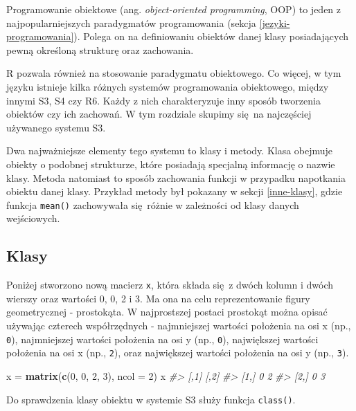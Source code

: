 \documentclass[paper=6in:9in,pagesize=pdftex,headinclude=on,footinclude=on,10pt]{scrbook}
\newenvironment{Shaded}{\begin{snugshade}}{\end{snugshade}}
\newcommand{\CommentTok}[1]{\textcolor[rgb]{0.56,0.35,0.01}{\textit{#1}}}
\newcommand{\DataTypeTok}[1]{\textcolor[rgb]{0.13,0.29,0.53}{#1}}
\newcommand{\DecValTok}[1]{\textcolor[rgb]{0.00,0.00,0.81}{#1}}
\newcommand{\KeywordTok}[1]{\textcolor[rgb]{0.13,0.29,0.53}{\textbf{#1}}}
\newcommand{\NormalTok}[1]{#1}
\newcommand{\StringTok}[1]{\textcolor[rgb]{0.31,0.60,0.02}{#1}}
\begin{document}
Programowanie obiektowe (ang. \emph{object-oriented programming}, OOP) to jeden z najpopularniejszych paradygmatów programowania (sekcja \ref{jezyki-programowania}).
Polega on na definiowaniu obiektów danej klasy posiadających pewną określoną strukturę oraz zachowania.

R pozwala również na stosowanie paradygmatu obiektowego.
Co więcej, w tym języku istnieje kilka różnych systemów programowania obiektowego, między innymi S3, S4 czy R6.
Każdy z nich charakteryzuje inny sposób tworzenia obiektów czy ich zachowań.
W tym rozdziale skupimy się~na najczęściej używanego systemu S3.

Dwa najważniejsze elementy tego systemu to klasy i metody.
Klasa obejmuje obiekty o podobnej strukturze, które posiadają specjalną informację o nazwie klasy.
Metoda natomiast to sposób zachowania funkcji w przypadku napotkania obiektu danej klasy.
Przykład metody był pokazany w sekcji \ref{inne-klasy}, gdzie funkcja \texttt{mean()} zachowywała się~różnie w zależności od klasy danych wejściowych.

\hypertarget{klasy}{%
\subsection{Klasy}\label{klasy}}

Poniżej stworzono nową macierz \texttt{x}, która składa się~z dwóch kolumn i dwóch wierszy oraz wartości 0, 0, 2 i 3.
Ma ona na celu reprezentowanie figury geometrycznej - prostokąta.
W najprostszej postaci prostokąt można opisać używając czterech współrzędnych - najmniejszej wartości położenia na osi x (np., \texttt{0}), najmniejszej wartości położenia na osi y (np., \texttt{0}), największej wartości położenia na osi x (np., \texttt{2}), oraz największej wartości położenia na osi y (np., \texttt{3}).

\begin{Shaded}
\begin{Highlighting}[]
\NormalTok{x =}\StringTok{ }\KeywordTok{matrix}\NormalTok{(}\KeywordTok{c}\NormalTok{(}\DecValTok{0}\NormalTok{, }\DecValTok{0}\NormalTok{, }\DecValTok{2}\NormalTok{, }\DecValTok{3}\NormalTok{), }\DataTypeTok{ncol =} \DecValTok{2}\NormalTok{)}
\NormalTok{x}
\CommentTok{#>      [,1] [,2]}
\CommentTok{#> [1,]    0    2}
\CommentTok{#> [2,]    0    3}
\end{Highlighting}
\end{Shaded}

Do sprawdzenia klasy obiektu w systemie S3 służy funkcja \texttt{class()}.
\end{document}
